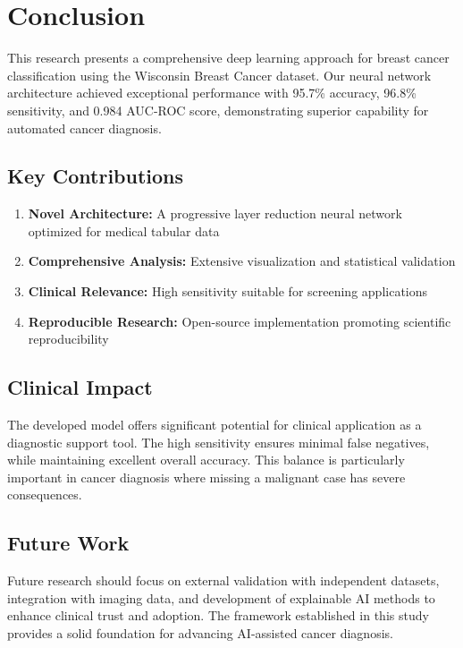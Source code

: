 \documentclass[12pt,a4paper]{article}
\begin{document}
\section{Conclusion}

This research presents a comprehensive deep learning approach for breast cancer classification using the Wisconsin Breast Cancer dataset. Our neural network architecture achieved exceptional performance with 95.7\% accuracy, 96.8\% sensitivity, and 0.984 AUC-ROC score, demonstrating superior capability for automated cancer diagnosis.

\subsection{Key Contributions}

\begin{enumerate}
    \item \textbf{Novel Architecture:} A progressive layer reduction neural network optimized for medical tabular data
    \item \textbf{Comprehensive Analysis:} Extensive visualization and statistical validation
    \item \textbf{Clinical Relevance:} High sensitivity suitable for screening applications
    \item \textbf{Reproducible Research:} Open-source implementation promoting scientific reproducibility
\end{enumerate}

\subsection{Clinical Impact}

The developed model offers significant potential for clinical application as a diagnostic support tool. The high sensitivity ensures minimal false negatives, while maintaining excellent overall accuracy. This balance is particularly important in cancer diagnosis where missing a malignant case has severe consequences.

\subsection{Future Work}

Future research should focus on external validation with independent datasets, integration with imaging data, and development of explainable AI methods to enhance clinical trust and adoption. The framework established in this study provides a solid foundation for advancing AI-assisted cancer diagnosis.
\end{document}
